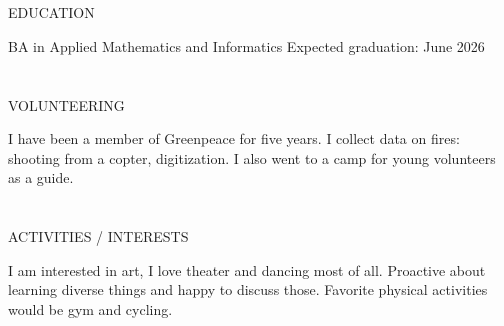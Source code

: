\documentclass{my_cv}
\begin{document}
\begin{multicols}{2}
\section{\faGraduationCap}{EDUCATION}
    
%
{BA in Applied Mathematics and Informatics}%
{Expected graduation: June 2026}

\section{\faStar}{VOLUNTEERING}

{I have been a member of Greenpeace for five years. I collect data on fires: shooting from a copter, digitization. I also went to a camp for young volunteers as a guide.}

\section{\faSoccerBallO}{ACTIVITIES / INTERESTS}

I am interested in art, I love theater and dancing most of all. Proactive about learning diverse things and happy to discuss those. Favorite physical activities would be gym and cycling.


\end{multicols}
\end{document}
